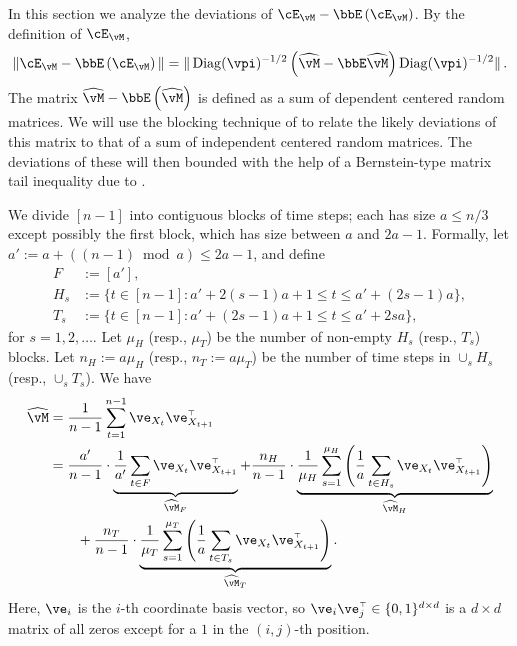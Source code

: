 In this section we analyze the deviations of $\errm-\EE{\errm}$. By the definition of $\errm$,
\begin{align}
\label{eq:errmdev1}
\norm{\errm-\EE{\errm}}
 =  \norm{\Diag(\vpi)^{-1/2}\Parens{\wh\vM - \bbE \wh\vM } \Diag(\vpi)^{-1/2}}
 \,.
\end{align}
The matrix $\wh\vM - \EE{\wh\vM}$  is defined 
as a sum of dependent centered random matrices.
We will use the blocking technique of \citet{Bernstein27} 
to relate the likely deviations of this matrix to that of
a sum of independent centered random matrices.
The deviations of these will then bounded
with the help of a Bernstein-type matrix tail inequality due to \citet{tropp2015intro}.

We divide $[n-1]$ into contiguous blocks of time steps; each has size
$a \leq n/3$ except possibly the first block, which has size between
$a$ and $2a-1$.
Formally, let $a' := a + ((n-1) \bmod a) \leq 2a-1$, and define
\begin{align*}
  F & := [a'] , \\
  H_s & := \{ t \in [n-1] : a' + 2(s-1)a + 1 \leq t \leq a' + (2s-1)a \} , \\
  T_s & := \{ t \in [n-1] : a' + (2s-1)a + 1 \leq t \leq a' + 2sa \} ,
\end{align*}
for $s=1,2,\dotsc$.
Let $\mu_H$ (resp., $\mu_T$) be the number of non-empty $H_s$ (resp., $T_s$)
blocks.
Let $n_H := a\mu_H$ (resp., $n_T := a\mu_T$) be the number of time
steps in $\cup_s H_s$ (resp., $\cup_s T_s$).
We have
\begin{align}
  \wh\vM
  & = \frac1{n-1} \sum_{t=1}^{n-1} \ve_{X_t} \ve_{X_{t+1}}^\t
  \notag \\
  & = \frac{a'}{n-1} \cdot
    \underbrace{
      \frac{1}{a'} \sum_{t\in F} \ve_{X_t} \ve_{X_{t+1}}^\t
     }_{\wh\vM_F} +
  \frac{n_H}{n-1} \cdot
  \underbrace{
    \frac1{\mu_H}
    \sum_{s=1}^{\mu_H}
    \Parens{
      \frac1a \sum_{t \in H_s} \ve_{X_t} \ve_{X_{t+1}}^\t
    }
  }_{\wh{\vM}_H}
  \notag \\
  & \qquad
  + \frac{n_T}{n-1} \cdot
  \underbrace{
    \frac1{\mu_T}
    \sum_{s=1}^{\mu_T}
    \Parens{
      \frac1a \sum_{t \in T_s} \ve_{X_t} \ve_{X_{t+1}}^\t
    }
  }_{\wh{\vM}_T}
  .
  \label{eq:blocking}
\end{align}
Here, $\ve_i$ is the $i$-th coordinate basis vector, so $\ve_i
\ve_j^\t \in \{0,1\}^{d \times d}$ is a $d \times d$ matrix of all
zeros except for a $1$ in the $(i,j)$-th position.

